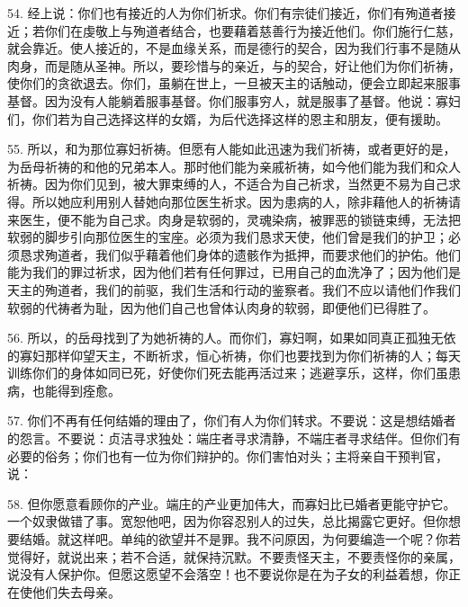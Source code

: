 54. 经上说：你们也有接近的人为你们祈求。你们有宗徒们接近，你们有殉道者接近；若你们在虔敬上与殉道者结合，也要藉着慈善行为接近他们。你们施行仁慈，就会靠近。使人接近的，不是血缘关系，而是德行的契合，因为我们行事不是随从肉身，而是随从圣神。所以，要珍惜与的亲近，与的契合，好让他们为你们祈祷，使你们的贪欲退去。你们，虽躺在世上，一旦被天主的话触动，便会立即起来服事基督。因为没有人能躺着服事基督。你们服事穷人，就是服事了基督。他说：寡妇们，你们若为自己选择这样的女婿，为后代选择这样的恩主和朋友，便有援助。\par

55. 所以，和为那位寡妇祈祷。但愿有人能如此迅速为我们祈祷，或者更好的是，为岳母祈祷的和他的兄弟本人。那时他们能为亲戚祈祷，如今他们能为我们和众人祈祷。因为你们见到，被大罪束缚的人，不适合为自己祈求，当然更不易为自己求得。所以她应利用别人替她向那位医生祈求。因为患病的人，除非藉他人的祈祷请来医生，便不能为自己求。肉身是软弱的，灵魂染病，被罪恶的锁链束缚，无法把软弱的脚步引向那位医生的宝座。必须为我们恳求天使，他们曾是我们的护卫；必须恳求殉道者，我们似乎藉着他们身体的遗骸作为抵押，而要求他们的护佑。他们能为我们的罪过祈求，因为他们若有任何罪过，已用自己的血洗净了；因为他们是天主的殉道者，我们的前驱，我们生活和行动的鉴察者。我们不应以请他们作我们软弱的代祷者为耻，因为他们自己也曾体认肉身的软弱，即便他们已得胜了。\par

56. 所以，的岳母找到了为她祈祷的人。而你们，寡妇啊，如果如同真正孤独无依的寡妇那样仰望天主，不断祈求，恒心祈祷，你们也要找到为你们祈祷的人；每天训练你们的身体如同已死，好使你们死去能再活过来；逃避享乐，这样，你们虽患病，也能得到痊愈。\par

57. 你们不再有任何结婚的理由了，你们有人为你们转求。不要说：这是想结婚者的怨言。不要说：贞洁寻求独处：端庄者寻求清静，不端庄者寻求结伴。但你们有必要的俗务；你们也有一位为你们辩护的。你们害怕对头；主将亲自干预判官，说：\par

58. 但你愿意看顾你的产业。端庄的产业更加伟大，而寡妇比已婚者更能守护它。一个奴隶做错了事。宽恕他吧，因为你容忍别人的过失，总比揭露它更好。但你想要结婚。就这样吧。单纯的欲望并不是罪。我不问原因，为何要编造一个呢？你若觉得好，就说出来；若不合适，就保持沉默。不要责怪天主，不要责怪你的亲属，说没有人保护你。但愿这愿望不会落空！也不要说你是在为子女的利益着想，你正在使他们失去母亲。\par

